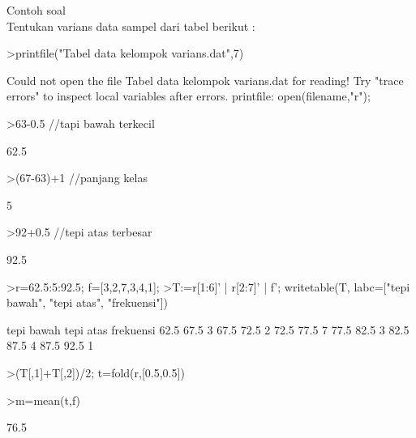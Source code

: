 \documentclass[a4paper,10pt]{article}
\begin{document}
\begin{eulernotebook}
\begin{eulercomment}
\begin{eulercomment}
\begin{eulercomment}
\begin{eulercomment}
\begin{eulercomment}
\begin{eulercomment}
\begin{eulercomment}
\begin{eulercomment}
\begin{eulercomment}
\begin{eulercomment}
\begin{eulercomment}
\begin{eulercomment}
\begin{eulercomment}
\begin{eulercomment}
\begin{eulercomment}
Contoh soal\\
Tentukan varians data sampel dari tabel berikut :
\end{eulercomment}
\begin{eulerprompt}
>printfile("Tabel data kelompok varians.dat",7) 
\end{eulerprompt}
\begin{euleroutput}
  Could not open the file
  Tabel data kelompok varians.dat
  for reading!
  Try "trace errors" to inspect local variables after errors.
  printfile:
      open(filename,"r");
\end{euleroutput}
\begin{eulerprompt}
>63-0.5  //tapi bawah terkecil
\end{eulerprompt}
\begin{euleroutput}
  62.5
\end{euleroutput}
\begin{eulerprompt}
>(67-63)+1  //panjang kelas
\end{eulerprompt}
\begin{euleroutput}
  5
\end{euleroutput}
\begin{eulerprompt}
>92+0.5  //tepi atas terbesar
\end{eulerprompt}
\begin{euleroutput}
  92.5
\end{euleroutput}
\begin{eulerprompt}
>r=62.5:5:92.5; f=[3,2,7,3,4,1];
>T:=r[1:6]' | r[2:7]' | f'; writetable(T, labc=["tepi bawah", "tepi atas", "frekuensi"])
\end{eulerprompt}
\begin{euleroutput}
   tepi bawah tepi atas frekuensi
         62.5      67.5         3
         67.5      72.5         2
         72.5      77.5         7
         77.5      82.5         3
         82.5      87.5         4
         87.5      92.5         1
\end{euleroutput}
\begin{eulerprompt}
>(T[,1]+T[,2])/2; t=fold(r,[0.5,0.5]) 
\end{eulerprompt}
\begin{euleroutput}
  [65,  70,  75,  80,  85,  90]
\end{euleroutput}
\begin{eulerprompt}
>m=mean(t,f)
\end{eulerprompt}
\begin{euleroutput}
  76.5
\end{euleroutput}
\begin{eulerprompt}

\end{eulerprompt}
\end{eulercomment}
\end{eulercomment}
\end{eulercomment}
\end{eulercomment}
\end{eulercomment}
\end{eulercomment}
\end{eulercomment}
\end{eulercomment}
\end{eulercomment}
\end{eulercomment}
\end{eulercomment}
\end{eulercomment}
\end{eulercomment}
\end{eulercomment}
\end{eulernotebook}
\end{document}

